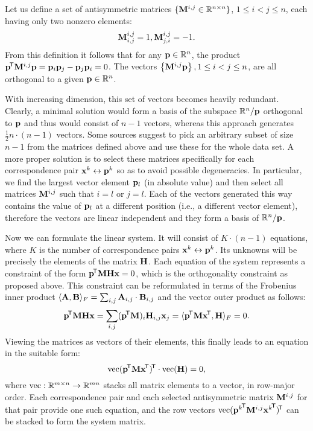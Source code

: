 Let us define a set of antisymmetric matrices $\{\mathbf{M}^{i, j} \in \mathbb{R}^{n \times n}\}$, $1 \leq i < j \leq n$, each having only two nonzero elements:
$$\mathbf{M}^{i, j}_{i, j} = 1,
\mathbf{M}^{i, j}_{j, i} = -1.$$
From this definition it follows that for any $\mathbf{p} \in \mathbb{R}^n$, the product $\mathbf{p}^{\!\mathsf{T}} \mathbf{M}^{i, j} \mathbf{p} = \mathbf{p}_{i} \mathbf{p}_{j} - \mathbf{p}_{j} \mathbf{p}_{i} = 0$.
The vectors $\left\{ \mathbf{M}^{i, j} \mathbf{p} \right\}, 1 \leq i < j \leq n$, are all orthogonal to a given $\mathbf{p} \in \mathbb{R}^n$.

With increasing dimension, this set of vectors becomes heavily redundant.
Clearly, a minimal solution would form a basis of the subspace $\mathbb{R}^n / \mathbf{p}$ orthogonal to $\mathbf{p}$ and thus would consist of $n - 1$ vectors, whereas this approach generates $\frac {1} {2} n \cdot (n - 1)$ vectors.
Some sources\cite{MVG} suggest to pick an arbitrary subset of size $n - 1$ from the matrices defined above and use these for the whole data set.
A more proper solution is to select these matrices specifically for each correspondence pair $\mathbf{x}^k \leftrightarrow \mathbf{p}^k$ so as to avoid possible degeneracies.
In particular, we find the largest vector element $\mathbf{p}_l$ (in absolute value) and then select all matrices $\mathbf{M}^{i, j}$ such that $i = l$ or $j = l$.
Each of the vectors generated this way contains the value of $\mathbf{p}_l$ at a different position (i.e., a different vector element), therefore the vectors are linear independent and they form a basis of $\mathbb{R}^n / \mathbf{p}$.

Now we can formulate the linear system.
It will consist of $K \cdot (n - 1)$ equations, where $K$ is the number of correspondence pairs $\mathbf{x}^k \leftrightarrow \mathbf{p}^k$.
Its unknowns will be precisely the elements of the matrix $\mathbf{H}$.
Each equation of the system represents a constraint of the form $\mathbf{p}^{\!\mathsf{T}} \mathbf{M} \mathbf{H} \mathbf{x} = 0$, which is the orthogonality constraint as proposed above.
This constraint can be reformulated in terms of the Frobenius inner product $\langle \mathbf{A}, \mathbf{B} \rangle_F = \sum_{i, j} \mathbf{A}_{i, j} \cdot \mathbf{B}_{i, j}$ and the vector outer product as follows:
$$\mathbf{p}^{\!\mathsf{T}} \mathbf{M} \mathbf{H} \mathbf{x} = \sum_{i, j} (\mathbf{p}^{\!\mathsf{T}} \mathbf{M})_i \mathbf{H}_{i, j} \mathbf{x}_j = \langle \mathbf{p}^{\!\mathsf{T}} \mathbf{M} \mathbf{x}^{\!\mathsf{T}}, \mathbf{H} \rangle_F = 0.$$
Viewing the matrices as vectors of their elements, this finally leads to an equation in the suitable form:
$$\textrm{vec} (\mathbf{p}^{\!\mathsf{T}} \mathbf{M} \mathbf{x}^{\!\mathsf{T}})^{\!\mathsf{T}} \cdot \textrm{vec}(\mathbf{H}) = 0,$$
where $\textrm{vec} : \mathbb{R}^{m \times n} \rightarrow \mathbb{R}^{mn}$ stacks all matrix elements to a vector, in row-major order.
Each correspondence pair and each selected antisymmetric matrix $\mathbf{M}^{i, j}$ for that pair provide one such equation, and the row vectors $\textrm{vec} ({\mathbf{p}^k}^{\!\mathsf{T}} \mathbf{M}^{i, j} {\mathbf{x}^k}^{\!\mathsf{T}})^{\!\mathsf{T}}$ can be stacked to form the system matrix.

